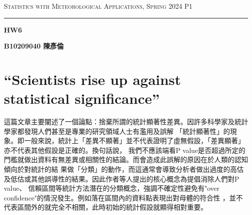 \documentclass{article}
\author{B10209040 陳彥倫}
\begin{document}
\thispagestyle{empty}
\hfill {\scshape \large Statistics with Meteorological Applications, Spring 2024} \hfill {\scshape P1}
\smallskip
\hrule
\begin{CJK*}{UTF8}{bsmi}
\bigskip
\bigskip
\bigskip

\centerline{\huge \textbf {HW6}}
\bigskip
\centerline{\textbf {B10209040 陳彥倫}}


\section*{“Scientists rise up against statistical significance”}
    \begin{spacing}{2.5}
        \begin{large}
        這篇文章主要闡述了一個論點：捨棄所謂的統計顯著性差異。因許多科學家及統計學家都發現人們甚至是專業的研究領域人士有濫用及誤解
        「統計顯著性」的現象。即一般來說，統計上「差異不顯著」並不代表證明了虛無假設，「差異顯著」亦不代表其他假設是正確的。換句話說，
        我們不應該端看P value是否超過所定的門檻就做出資料有無差異或相關性的結論。而會造成此誤解的原因在於人類的認知傾向於對統計的結
        果做「分類」的動作，而這通常會導致分析者做出過度的高估及低估或其他誤導性的結果。因此作者等人提出的核心概念為提倡消除人們對P value、
        信賴區間等統計方法潛在的分類概念，強調不確定性避免有"over confidence"的情況發生。例如落在區間內的資料點表現出對母體的符合性
        ，並不代表區間外的就完全不相關，此時初始的統計假設就顯得相對重要。
        \end{large}
    \end{spacing}



\end{CJK*}
\end{document}
